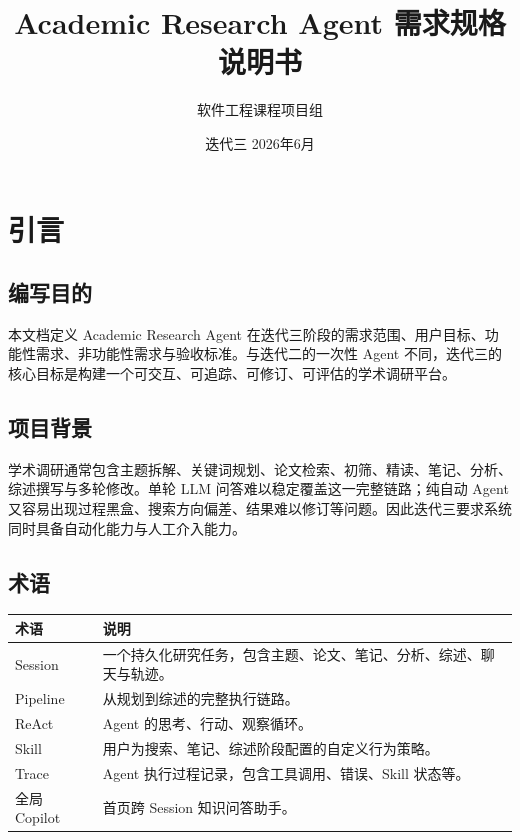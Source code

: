 \documentclass[12pt,a4paper,onecolumn]{ctexart}
\title{\textbf{Academic Research Agent 需求规格说明书}}
\author{软件工程课程项目组}
\date{迭代三 \quad 2026年6月}
\begin{document}
\maketitle
\thispagestyle{empty}
\newpage
\tableofcontents
\newpage

\section{引言}

\subsection{编写目的}
本文档定义 Academic Research Agent 在迭代三阶段的需求范围、用户目标、功能性需求、非功能性需求与验收标准。与迭代二的一次性 Agent 不同，迭代三的核心目标是构建一个可交互、可追踪、可修订、可评估的学术调研平台。

\subsection{项目背景}
学术调研通常包含主题拆解、关键词规划、论文检索、初筛、精读、笔记、分析、综述撰写与多轮修改。单轮 LLM 问答难以稳定覆盖这一完整链路；纯自动 Agent 又容易出现过程黑盒、搜索方向偏差、结果难以修订等问题。因此迭代三要求系统同时具备自动化能力与人工介入能力。

\subsection{术语}
\begin{longtable}{p{3.2cm}p{10.2cm}}
\toprule
\textbf{术语} & \textbf{说明} \\
\midrule
Session & 一个持久化研究任务，包含主题、论文、笔记、分析、综述、聊天与轨迹。\\
Pipeline & 从规划到综述的完整执行链路。\\
ReAct & Agent 的思考、行动、观察循环。\\
Skill & 用户为搜索、笔记、综述阶段配置的自定义行为策略。\\
Trace & Agent 执行过程记录，包含工具调用、错误、Skill 状态等。\\
全局 Copilot & 首页跨 Session 知识问答助手。\\
\bottomrule
\end{longtable}

\end{document}
